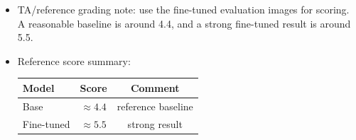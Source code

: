 \begin{Q}
\begin{solution}
\begin{itemize}
\item TA/reference grading note: use the fine-tuned evaluation images for scoring. A reasonable baseline is around 4.4, and a strong fine-tuned result is around 5.5.
\item Reference score summary:
\begin{tabular}{lcc}
\hline
Model & Score & Comment \\
\hline
Base & $\approx 4.4$ & reference baseline \\
Fine-tuned & $\approx 5.5$ & strong result \\
\hline
\end{tabular}
\end{itemize}
\end{solution}

\end{Q}
